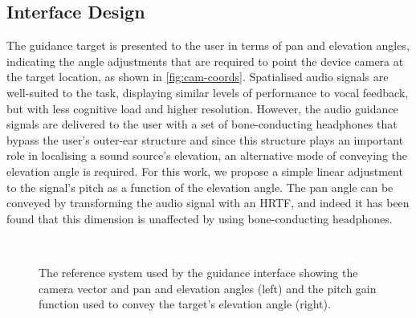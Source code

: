 \documentclass{llncs}
\begin{document}
\subsection{Interface Design}

The guidance target is presented to the user in terms of pan and elevation angles, indicating the angle adjustments that are required to point the device camera at the target location, as shown in \cref{fig:cam-coords}.
Spatialised audio signals are well-suited to the task, displaying similar levels of performance to vocal feedback, but with less cognitive load and higher resolution\cite{klatzky2006cognitive}.
However, the audio guidance signals are delivered to the user with a set of bone-conducting headphones that bypass the user's outer-ear structure and since this structure plays an important role in localising a sound source's elevation\cite{blauert1969sound}, an alternative mode of conveying the elevation angle is required.
For this work, we propose a simple linear adjustment to the signal's pitch as a function of the elevation angle. 
The pan angle can be conveyed by transforming the audio signal with an HRTF, and indeed it has been found that this dimension is unaffected by using bone-conducting headphones\cite{schonstein2008comparison,macdonald2006spatial,stanley2006lateralization}. 

\begin{figure}
  \centering
~
  \caption{The reference system used by the guidance interface showing the camera vector and pan and elevation angles (left) and the pitch gain function used to convey the target's elevation angle (right). }
\end{figure}
\end{document}

